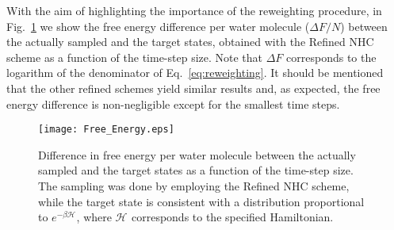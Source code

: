 \documentclass[
	aip,
	jcp,
	reprint,
]{revtex4-1}
\newcommand{\Ham}[1]{{\mathcal H}_\text{#1}}           %
\begin{document}
With the aim of highlighting the importance of the reweighting procedure, in Fig.~\ref{fig:free_energy} we show the free energy difference per water molecule ($\Delta F/N$) between the actually sampled and the target states, obtained with the Refined NHC scheme as a function of the time-step size.
Note that $\Delta F$ corresponds to the logarithm of the denominator of Eq.~\eqref{eq:reweighting}.
It should be mentioned that the other refined schemes yield similar results and, as expected, the free energy difference is non-negligible except for the smallest time steps.

\begin{figure}
	\texttt{[image: Free\_Energy.eps]}
	\caption{Difference in free energy per water molecule between the actually sampled and the target states as a function of the time-step size. The sampling was done by employing the Refined NHC scheme, while the target state is consistent with a distribution proportional to $e^{-\beta \Ham{}}$, where $\Ham{}$ corresponds to the specified Hamiltonian.}
	\label{fig:free_energy}
\end{figure}
\end{document}
